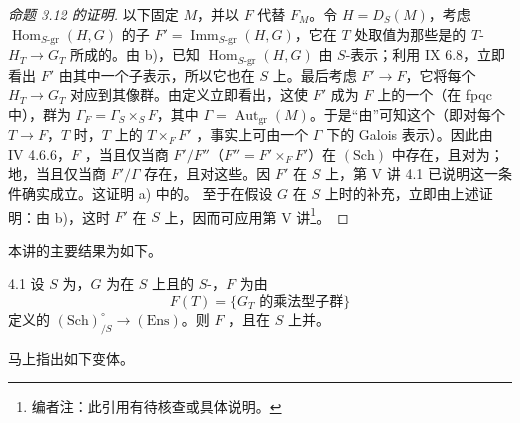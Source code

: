 \begin{proof}[命题 3.12 的证明]
以下固定 $M$，并以 $F$ 代替 $F_M$。令 $H=D_S(M)$，考虑 $\operatorname{Hom}_{S\text{-gr}}(H,G)$ 的子 $F'=\operatorname{Imm}_{S\text{-gr}}(H,G)$，它在 $T$ 处取值为那些是的 $T$- $H_T\to G_T$ 所成的。由 b)，已知 $\operatorname{Hom}_{S\text{-gr}}(H,G)$ 由 $S$-表示；利用 IX 6.8，立即看出 $F'$ 由其中一个子表示，所以它也在 $S$ 上。最后考虑 $F'\to F$，它将每个 $H_T\to G_T$ 对应到其像群。由定义立即看出，这使 $F'$ 成为 $F$ 上的一个（在 fpqc 中），群为 $\Gamma_F=\Gamma_S\times_S F$，其中 $\Gamma=\operatorname{Aut}_{\mathrm{gr}}(M)$。于是“由”可知这个（即对每个 $T\to F$，$T$ 时，$T$ 上的 $T\times_F F'$ ，事实上可由一个 $\Gamma$ 下的 Galois 表示）。因此由 IV 4.6.6，$F$ ，当且仅当商 $F'/F''$（$F''=F'\times_F F'$）在 $(\mathrm{Sch})$ 中存在，且对为；地，当且仅当商 $F'/\Gamma$ 存在，且对这些。因 $F'$ 在 $S$ 上，第 V 讲 4.1 已说明这一条件确实成立。这证明 a) 中的。
至于在假设 $G$ 在 $S$ 上时的补充，立即由上述证明：由 b)，这时 $F'$ 在 $S$ 上，因而可应用第 V 讲\footnote[3]{编者注：此引用有待核查或具体说明。}。
\end{proof}
本讲的主要结果为如下。
\begin{SGAresult}{}{4.1}
设 $S$ 为，$G$ 为在 $S$ 上且的 $S$-，$F$ 为由
\[F(T)=\{G_T\text{ 的乘法型子群}\}\]
定义的 $(\mathrm{Sch})^\circ_{/S}\to(\mathrm{Ens})$。则 $F$ ，且在 $S$ 上并。
\end{SGAresult}
马上指出如下变体。
